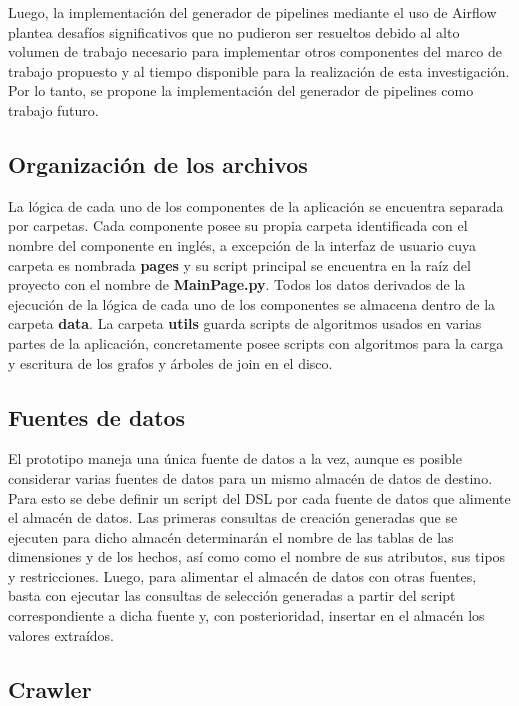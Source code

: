 Luego, la implementación del generador de pipelines mediante el uso de Airflow plantea desafíos significativos que 
no pudieron ser resueltos debido al alto volumen de trabajo necesario para implementar otros componentes del marco 
de trabajo propuesto y al tiempo disponible para la realización de esta investigación. Por lo tanto, se propone 
la implementación del generador de pipelines como trabajo futuro.

\subsection{Organización de los archivos}

La lógica de cada uno de los componentes de la aplicación se encuentra separada por carpetas. Cada componente 
posee su propia carpeta identificada con el nombre del componente en inglés, a excepción de la interfaz de usuario 
cuya carpeta es nombrada \textbf{pages} y su script principal se encuentra en la raíz del proyecto con el nombre de 
\textbf{MainPage.py}. Todos los datos derivados de la ejecución de la lógica de cada uno de los componentes 
se almacena dentro de la carpeta \textbf{data}. La carpeta \textbf{utils} guarda scripts de algoritmos usados 
en varias partes de la aplicación, concretamente posee scripts con algoritmos para la carga y escritura de los 
grafos y \'arboles de join en el disco.

\subsection{Fuentes de datos}

El prototipo maneja una única fuente de datos a la vez, aunque es posible considerar varias 
fuentes de datos para un mismo almacén de datos de destino. Para esto se debe definir un script del DSL por 
cada fuente de datos que alimente el almacén de datos. Las primeras consultas de creación generadas que se ejecuten 
para dicho almacén determinarán el nombre de las tablas de las dimensiones y de los hechos, as\'i como 
como el nombre de sus atributos, sus tipos y restricciones. Luego, para alimentar el almacén de datos con otras 
fuentes, basta con ejecutar las consultas de selección generadas a partir del script correspondiente a 
dicha fuente y, con posterioridad, insertar en el almacén los valores extra\'idos.

\subsection{Crawler}

